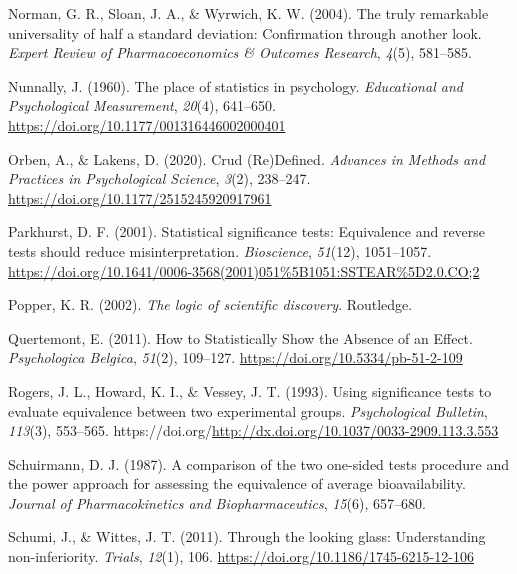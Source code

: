\documentclass[
  letterpaper,
  DIV=11,
  numbers=noendperiod]{scrreprt}
\newlength{\cslhangindent}
\newlength{\cslentryspacingunit} %
\newenvironment{CSLReferences}[2] %
 {%
  \setlength{\parindent}{0pt}
  \ifodd #1
  \let\oldpar\par
  \def\par{\hangindent=\cslhangindent\oldpar}
  \fi
  \setlength{\parskip}{#2\cslentryspacingunit}
 }%
 {}
\begin{document}
\begin{CSLReferences}{1}{0}
\leavevmode{}%
Norman, G. R., Sloan, J. A., \& Wyrwich, K. W. (2004). The truly
remarkable universality of half a standard deviation: Confirmation
through another look. \emph{Expert Review of Pharmacoeconomics \&
Outcomes Research}, \emph{4}(5), 581--585.

\leavevmode{}%
Nunnally, J. (1960). The place of statistics in psychology.
\emph{Educational and Psychological Measurement}, \emph{20}(4),
641--650. \url{https://doi.org/10.1177/001316446002000401}

\leavevmode{}%
Orben, A., \& Lakens, D. (2020). Crud ({Re}){Defined}. \emph{Advances in
Methods and Practices in Psychological Science}, \emph{3}(2), 238--247.
\url{https://doi.org/10.1177/2515245920917961}

\leavevmode{}%
Parkhurst, D. F. (2001). Statistical significance tests: {Equivalence}
and reverse tests should reduce misinterpretation. \emph{Bioscience},
\emph{51}(12), 1051--1057.
\url{https://doi.org/10.1641/0006-3568(2001)051\%5B1051:SSTEAR\%5D2.0.CO;2}

\leavevmode{}%
Popper, K. R. (2002). \emph{{The logic of scientific discovery}}.
{Routledge}.

\leavevmode{}%
Quertemont, E. (2011). How to {Statistically Show} the {Absence} of an
{Effect}. \emph{Psychologica Belgica}, \emph{51}(2), 109--127.
\url{https://doi.org/10.5334/pb-51-2-109}

\leavevmode{}%
Rogers, J. L., Howard, K. I., \& Vessey, J. T. (1993). Using
significance tests to evaluate equivalence between two experimental
groups. \emph{Psychological Bulletin}, \emph{113}(3), 553--565.
https://doi.org/\url{http://dx.doi.org/10.1037/0033-2909.113.3.553}

\leavevmode{}%
Schuirmann, D. J. (1987). A comparison of the two one-sided tests
procedure and the power approach for assessing the equivalence of
average bioavailability. \emph{Journal of Pharmacokinetics and
Biopharmaceutics}, \emph{15}(6), 657--680.

\leavevmode{}%
Schumi, J., \& Wittes, J. T. (2011). Through the looking glass:
Understanding non-inferiority. \emph{Trials}, \emph{12}(1), 106.
\url{https://doi.org/10.1186/1745-6215-12-106}


\end{CSLReferences}
\end{document}
